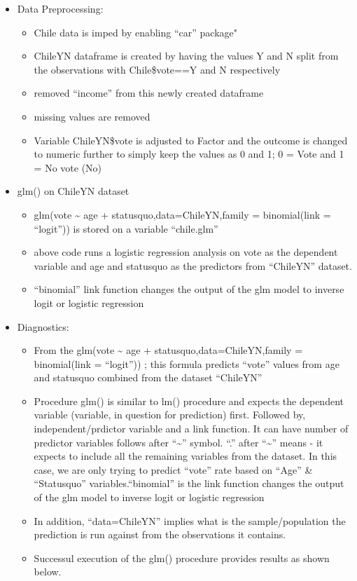 \documentclass[]{article}
\providecommand{\tightlist}{%
  \setlength{\itemsep}{0pt}\setlength{\parskip}{0pt}}
\begin{document}
\begin{itemize}
\tightlist
\item
  Data Preprocessing:

  \begin{itemize}
  \tightlist
  \item
    Chile data is imped by enabling ``car'' package"
  \item
    ChileYN dataframe is created by having the values Y and N split from
    the observations with Chile\$vote==Y and N respectively
  \item
    removed ``income'' from this newly created dataframe
  \item
    missing values are removed
  \item
    Variable ChileYN\$vote is adjusted to Factor and the outcome is
    changed to numeric further to simply keep the values as 0 and 1; 0 =
    Vote and 1 = No vote (No)
  \end{itemize}
\item
  glm() on ChileYN dataset

  \begin{itemize}
  \tightlist
  \item
    glm(vote \textasciitilde{} age + statusquo,data=ChileYN,family =
    binomial(link = ``logit'')) is stored on a variable ``chile.glm''
  \item
    above code runs a logistic regression analysis on vote as the
    dependent variable and age and statusquo as the predictors from
    ``ChileYN'' dataset.
  \item
    ``binomial'' link function changes the output of the glm model to
    inverse logit or logistic regression
  \end{itemize}
\item
  Diagnostics:

  \begin{itemize}
  \tightlist
  \item
    From the glm(vote \textasciitilde{} age +
    statusquo,data=ChileYN,family = binomial(link = ``logit'')) ; this
    formula predicts ``vote'' values from age and statusquo combined
    from the dataset ``ChileYN''
  \item
    Procedure glm() is similar to lm() procedure and expects the
    dependent variable (variable, in question for prediction) first.
    Followed by, independent/prdictor variable and a link function. It
    can have number of predictor variables follows after
    ``\textasciitilde{}'' symbol. ``.'' after ``\textasciitilde{}''
    means - it expects to include all the remaining variables from the
    dataset. In this case, we are only trying to predict ``vote'' rate
    based on ``Age'' \& ``Statusquo'' variables.``binomial'' is the link
    function changes the output of the glm model to inverse logit or
    logistic regression
  \item
    In addition, ``data=ChileYN'' implies what is the sample/population
    the prediction is run against from the observations it contains.
  \item
    Successul execution of the glm() procedure provides results as shown
    below.


\end{itemize}
\end{itemize}
\end{document}
